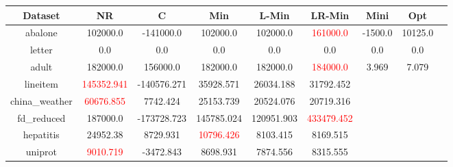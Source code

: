 \documentclass[11pt]{book}
\begin{document}
\begin{table}

	\centering
	
\begin{tabular}{|c|c|c|c|c|c|c|c|c|}

    \hline
    Dataset &
    	NR &
    	C &
    	Min &
    	L-Min &
    	LR-Min &
    	Mini &
    	Opt \\
    	    
    \hline
    
abalone & 102000.0 & -141000.0 & 102000.0 & 102000.0 & \textcolor{red}{161000.0} & -1500.0 & 10125.0 \\                                                                                                                               
letter & 0.0 & 0.0 & 0.0 & 0.0 & 0.0 & 0.0 & 0.0 \\                                                                                                                                                                  
adult & 182000.0 & 156000.0 & 182000.0 & 182000.0 & \textcolor{red}{184000.0} & 3.969 & 7.079 \\                                                                                                                                      
lineitem & \textcolor{red}{145352.941} & -140576.271 & 35928.571 & 26034.188 & 31792.452 && \\                                                                                                                                           
china\_weather & \textcolor{red}{60676.855} & 7742.424 & 25153.739 & 20524.076 & 20719.316 && \\                                                                                                                                          
fd\_reduced & 187000.0 & -173728.723 & 145785.024 & 120951.903 & \textcolor{red}{433479.452} && \\                                                                                                                                        
hepatitis & 24952.38 & 8729.931 & \textcolor{red}{10796.426} & 8103.415 & 8169.515 && \\                                                                                                                                                 
uniprot & \textcolor{red}{9010.719} & -3472.843 & 8698.931 & 7874.556 & 8315.555 && \\                                                                                                                                                   

\end{tabular}
\end{table}
\end{document}
